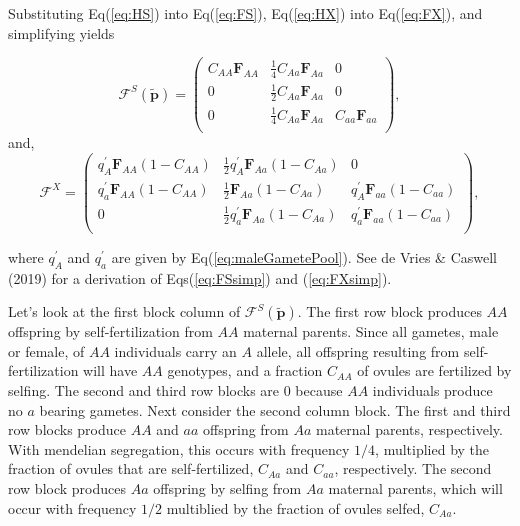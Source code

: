 \documentclass[11pt]{article}
\def\mbf#1{\mathbf{#1}}
\def\mcal#1{\mathcal{#1}}
\begin{document}
Substituting Eq(\ref{eq:HS}) into Eq(\ref{eq:FS}), Eq(\ref{eq:HX}) into Eq(\ref{eq:FX}), and simplifying yields

\begin{equation} \label{eq:FSsimp}
	\mcal{F}^S(\tilde{\mbf{p}}) = 
			\left(
			\begin{array}{c|c|c}
				C_{AA} \mbf{F}_{AA} & \frac{1}{4} C_{Aa} \mbf{F}_{Aa} & 0 \\ \hline
				0 & \frac{1}{2} C_{Aa} \mbf{F}_{Aa} & 0 \\ \hline
				0 & \frac{1}{4} C_{Aa} \mbf{F}_{Aa} & C_{aa} \mbf{F}_{aa}\\
			\end{array} \right), 
\end{equation}
\noindent and, 
\begin{equation} \label{eq:FXsimp}
	\mcal{F}^X = 
			\left(
			\begin{array}{c|c|c}
				q^{\prime}_{A} \mbf{F}_{AA} (1 - C_{AA})& \frac{1}{2} q^{\prime}_{A} \mbf{F}_{Aa} (1 - C_{Aa}) & 0 \\ \hline
				q^{\prime}_{a} \mbf{F}_{AA} (1 - C_{AA}) & \frac{1}{2} \mbf{F}_{Aa} (1 - C_{Aa}) & q^{\prime}_{A} \mbf{F}_{aa} (1 - C_{aa}) \\ \hline
				0 & \frac{1}{2} q^{\prime}_{a} \mbf{F}_{Aa} (1 - C_{Aa})& q^{\prime}_{a} \mbf{F}_{aa} (1 - C_{aa}) \\
			\end{array} \right), 
\end{equation}

\noindent where $q^{\prime}_A$ and $q^{\prime}_a$ are given by Eq(\ref{eq:maleGametePool}). See de Vries \& Caswell (2019) for a derivation of Eqs(\ref{eq:FSsimp}) and (\ref{eq:FXsimp}).

Let's look at the first block column of $\mcal{F}^S(\tilde{\mbf{p}})$. The first row block produces $AA$ offspring by self-fertilization from $AA$ maternal parents. Since all gametes, male or female, of $AA$ individuals carry an $A$ allele, all offspring resulting from self-fertilization will have $AA$ genotypes, and a fraction $C_{AA}$ of ovules are fertilized by selfing. The second and third row blocks are $0$ because $AA$ individuals produce no $a$ bearing gametes. Next consider the second column block. The first and third row blocks produce $AA$ and $aa$ offspring from $Aa$ maternal parents, respectively. With mendelian segregation, this occurs with frequency $1/4$, multiplied by the fraction of ovules that are self-fertilized, $C_{Aa}$ and $C_{aa}$, respectively. The second row block produces $Aa$ offspring by selfing from $Aa$ maternal parents, which will occur with frequency $1/2$ multiblied by the fraction of ovules selfed, $C_{Aa}$. 
\end{document}
